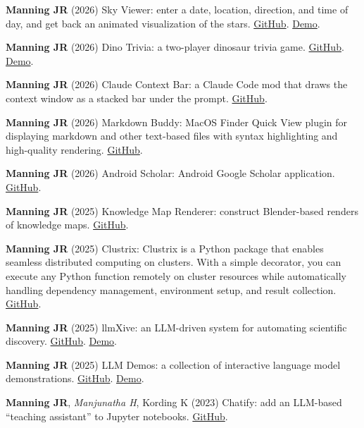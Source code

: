 \documentclass[11pt, a4paper]{article} %
\begin{document}
\begin{etaremune}
\item \textbf{Manning JR} (2026) Sky Viewer: enter a date, location, direction, and time of day, and get back an animated visualization of the stars. \href{https://github.com/ContextLab/sky-viewer}{GitHub}. \href{https://context-lab.com/sky-viewer}{Demo}.
\item \textbf{Manning JR} (2026) Dino Trivia: a two-player dinosaur trivia game. \href{https://github.com/ContextLab/dino-trivia}{GitHub}. \href{https://context-lab.com/dino-trivia}{Demo}.
\item \textbf{Manning JR} (2026) Claude Context Bar: a Claude Code mod that draws the context window as a stacked bar under the prompt. \href{https://github.com/ContextLab/claude-context-bar}{GitHub}.
\item \textbf{Manning JR} (2026) Markdown Buddy: MacOS Finder Quick View plugin for displaying markdown and other text-based files with syntax highlighting and high-quality rendering. \href{https://github.com/ContextLab/md-buddy}{GitHub}.
\item \textbf{Manning JR} (2026) Android Scholar: Android Google Scholar application. \href{https://github.com/ContextLab/android-scholar}{GitHub}.
\item \textbf{Manning JR} (2025) Knowledge Map Renderer: construct Blender-based renders of knowledge maps. \href{https://github.com/ContextLab/knowledge-map-renders}{GitHub}.
\item \textbf{Manning JR} (2025) Clustrix: Clustrix is a Python package that enables seamless distributed computing on clusters. With a simple decorator, you can execute any Python function remotely on cluster resources while automatically handling dependency management, environment setup, and result collection. \href{https://github.com/ContextLab/clustrix}{GitHub}.
\item \textbf{Manning JR} (2025) llmXive: an LLM-driven system for automating scientific discovery. \href{https://github.com/ContextLab/llmXive}{GitHub}. \href{https://context-lab.com/llmXive}{Demo}.
\item \textbf{Manning JR} (2025) LLM Demos: a collection of interactive language model demonstrations. \href{https://github.com/ContextLab/llm-course/tree/main/demos}{GitHub}. \href{https://context-lab.com/llm-course/demos/}{Demo}.
\item \textbf{Manning JR}, \textit{Manjunatha H}, Kording K (2023) Chatify: add an LLM-based ``teaching assistant'' to Jupyter notebooks. \href{https://github.com/ContextLab/chatify}{GitHub}.

\end{etaremune}
\end{document}
